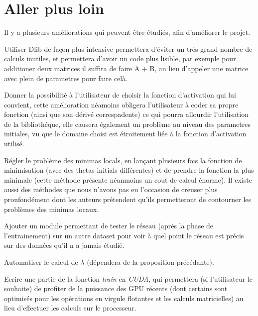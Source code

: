\section{Aller plus loin}

Il y a plusieurs améliorations qui peuvent être étudiés, afin d'améliorer le projet.

Utiliser Dlib de façon plus intensive permettera d'éviter un trés grand nombre de calculs inutiles, et permettera d'avoir un code plus lisible, par exemple pour additioner deux matrices il suffira de faire A + B, au lieu d'appeler une matrice avec plein de parametres pour faire celà.

Donner la possibilité à l'utilisateur de choisir la fonction d'activation qui lui convient, cette amélioration néamoins obligera l'utilisateur à coder sa propre fonction (ainsi que son dérivé correspadente) ce qui pourra allourdir l'utilisation de la bibliothéque, elle causera également un problème au niveau des parametres initiales, vu que le domaine choisi est étroitement liée à la fonction d'activation utilisé.

Régler le problème des minimas locals, en lançant plusieurs fois la fonction de minimisation (avec des thetas initials différentes) et de prendre la fonction la plus minimale (cette méthode présente néanmoins un cout de calcul énorme). Il existe aussi des méthodes que nous n'avons pas eu l'occasion de creuser plus pronfondément dont les auteurs prétendent qu'ils permetteront de contourner les problèmes des minimas locaux.

Ajouter un module permettant de tester le réseau (aprés la phase de l'entrainement) sur un autre dataset pour voir à quel point le réseau est précis sur des données qu'il n a jamais étudié.

Automatiser le calcul de $\lambda$ (dépendera de la proposition précédante).

Ecrire une partie de la fonction \textit{train} en \textit{CUDA}, qui permettera (si l'utilisateur le souhaite) de profiter de la puissance des GPU récents (dont certains sont optimisés pour les opérations en virgule flotantes et les calculs matricielles) au lieu d'effectuer les calculs sur le processeur.
